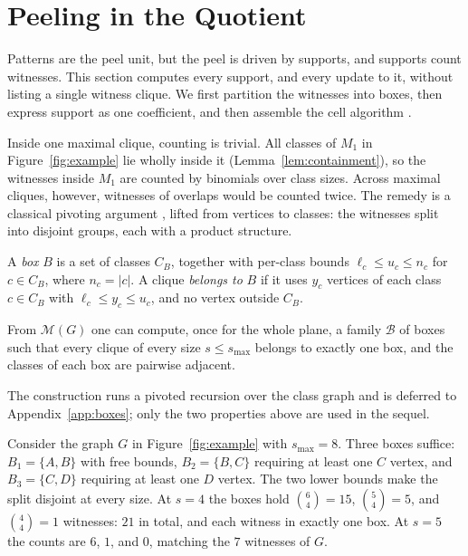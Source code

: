 \section{Peeling in the Quotient}\label{sec:peelcell}
Patterns are the peel unit, but the peel is driven by supports, and supports count witnesses.
%
This section computes every support, and every update to it, without listing a single witness clique.
%
We first partition the witnesses into boxes, then express support as one coefficient, and then assemble the cell algorithm \peelcell.

Inside one maximal clique, counting is trivial.
%
All classes of $M_1$ in Figure~\ref{fig:example} lie wholly inside it (Lemma~\ref{lem:containment}), so the witnesses inside $M_1$ are counted by binomials over class sizes.
%
Across maximal cliques, however, witnesses of overlaps would be counted twice.
%
The remedy is a classical pivoting argument \cite{Pivoter,NuclearCD}, lifted from vertices to classes: the witnesses split into disjoint groups, each with a product structure.

\begin{definition}[Box]\label{def:box}
A \emph{box} $B$ is a set of classes $C_B$, together with per-class bounds $\ell_c\le u_c\le n_c$ for $c\in C_B$, where $n_c=|c|$.
%
A clique \emph{belongs to} $B$ if it uses $y_c$ vertices of each class $c\in C_B$ with $\ell_c\le y_c\le u_c$, and no vertex outside $C_B$.
\end{definition}

\begin{lemma}\label{lem:boxes}
From $\mathcal{M}(G)$ one can compute, once for the whole plane, a family $\mathcal{B}$ of boxes such that every clique of every size $s\le s_{\max}$ belongs to exactly one box, and the classes of each box are pairwise adjacent.
\end{lemma}

The construction runs a pivoted recursion over the class graph and is deferred to Appendix~\ref{app:boxes}; only the two properties above are used in the sequel.

\begin{example}\label{exa:boxes}
Consider the graph $G$ in Figure~\ref{fig:example} with $s_{\max}=8$.
%
Three boxes suffice: $B_1=\{A,B\}$ with free bounds, $B_2=\{B,C\}$ requiring at least one $C$ vertex, and $B_3=\{C,D\}$ requiring at least one $D$ vertex.
%
The two lower bounds make the split disjoint at every size.
%
At $s=4$ the boxes hold $\binom{6}{4}=15$, $\binom{5}{4}=5$, and $\binom{4}{4}=1$ witnesses: $21$ in total, and each witness in exactly one box.
%
At $s=5$ the counts are $6$, $1$, and $0$, matching the $7$ witnesses of $G$.
\end{example}

